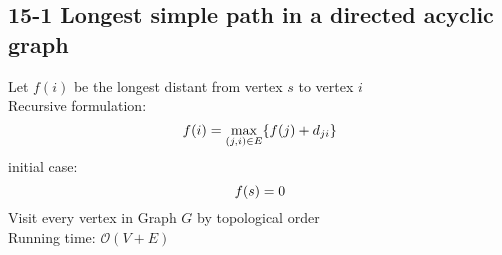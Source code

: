 \subsection*{15-1 Longest simple path in a directed acyclic graph}
\noindent Let $f(i)$ be the longest distant from vertex $s$ to vertex $i$ \\
Recursive formulation:
\begin{equation} \notag
	f(i) = \max_{(j, i) \in E}\{f(j) + d_{ji}\} \\
\end{equation}
initial case:
\begin{equation} \notag
	f(s) = 0
\end{equation}
Visit every vertex in Graph $G$ by topological order \\
Running time: $\mathcal{O}(V + E)$

